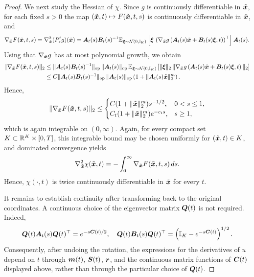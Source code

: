 \begin{proof}
We next study the Hessian of $\chi$.
Since $g$ is continuously differentiable in $\tilde{\boldsymbol{x}}$, for each fixed $s>0$ the map
$(\tilde{\boldsymbol{x}},t)\mapsto F(\tilde{\boldsymbol{x}},t,s)$ is continuously differentiable in $\tilde{\boldsymbol{x}}$, and
\begin{equation*}
    \nabla_{\tilde{\boldsymbol{x}}} F(\tilde{\boldsymbol{x}},t,s) = \nabla_{\tilde{\boldsymbol{x}}}^2(P_s^t g)(\tilde{\boldsymbol{x}}) = \boldsymbol{A}_t(s)\boldsymbol{B}_t(s)^{-1} \mathbb{E}_{\boldsymbol{\xi} \sim \mathcal{N}(0,\mathbb{I}_K)} \left[ \boldsymbol{\xi} \, \left(\nabla_{\tilde{\boldsymbol{x}}} g\left(\boldsymbol{A}_t(s)\tilde{\boldsymbol{x}}+\boldsymbol{B}_t(s)\boldsymbol{\xi},t\right)\right)^\top \right] \boldsymbol{A}_t(s).
\end{equation*}
Using that $\nabla_{\tilde{\boldsymbol{x}}}g$ has at most polynomial growth, we obtain
\begin{equation*}
\begin{aligned}
    \|\nabla_{\tilde{\boldsymbol{x}}} F(\tilde{\boldsymbol{x}},t,s)\|_2&\leq\|\boldsymbol{A}_t(s)\boldsymbol{B}_t(s)^{-1}\|_{\mathrm{op}} \,\|\boldsymbol{A}_t(s)\|_{\mathrm{op}} \, \mathbb{E}_{\boldsymbol{\xi} \sim \mathcal{N}(0,\mathbb{I}_K)} \left[\|\boldsymbol{\xi}\|_2\,\|\nabla_{\tilde{\boldsymbol{x}}} g\left(\boldsymbol{A}_t(s)\tilde{\boldsymbol{x}}+\boldsymbol{B}_t(s)\boldsymbol{\xi},t\right)\|_2 \right] \\
    &\leq C\|\boldsymbol{A}_t(s)\boldsymbol{B}_t(s)^{-1}\|_{\mathrm{op}}\,\|\boldsymbol{A}_t(s)\|_{\mathrm{op}} \left(1+\|\boldsymbol{A}_t(s)\tilde{\boldsymbol{x}}\|_2^m\right).
\end{aligned}
\end{equation*}
Hence,
\begin{equation*}
    \|\nabla_{\tilde{\boldsymbol{x}}} F(\tilde{\boldsymbol{x}},t,s)\|_2 \leq \begin{cases} C(1+\|\tilde{\boldsymbol{x}}\|_2^m)s^{-1/2}, & 0 < s \leq 1,\\ C_t(1+\|\tilde{\boldsymbol{x}}\|_2^m)e^{-c_t s}, & s\ge 1, \end{cases}
\end{equation*}
which is again integrable on $(0,\infty)$. Again, for every compact set $K \subset \mathbb{R}^K \times [0,T]$, this integrable bound may be chosen uniformly for $(\tilde{\boldsymbol{x}},t)\in K$, and dominated convergence yields
\begin{equation*}
    \nabla_{\tilde{\boldsymbol{x}}}^2 \chi(\tilde{\boldsymbol{x}},t) = -\int_0^\infty \nabla_{\tilde{\boldsymbol{x}}}F(\tilde{\boldsymbol{x}},t,s)\,ds.
\end{equation*}
Hence, $\chi(\cdot,t)$ is twice continuously differentiable in $\tilde{\boldsymbol{x}}$ for every $t$.

It remains to establish continuity after transforming back to the original coordinates. A continuous choice of the eigenvector matrix $\boldsymbol{Q}(t)$ is not required. Indeed,
\begin{equation*}
    \boldsymbol{Q}(t)\boldsymbol{A}_t(s)\boldsymbol{Q}(t)^\top = e^{-s\boldsymbol{C}(t)/2}, \quad  \boldsymbol{Q}(t)\boldsymbol{B}_t(s)\boldsymbol{Q}(t)^\top = \left(\mathbb{I}_K-e^{-s\boldsymbol{C}(t)}\right)^{1/2}.
\end{equation*}
Consequently, after undoing the rotation, the expressions for the derivatives of $u$ depend on $t$ through $\boldsymbol{m}(t)$, $\boldsymbol{S}(t)$, $\boldsymbol{r}$, and the continuous matrix functions of $\boldsymbol{C}(t)$ displayed above, rather than through the particular choice of $\boldsymbol{Q}(t)$.


\end{proof}
